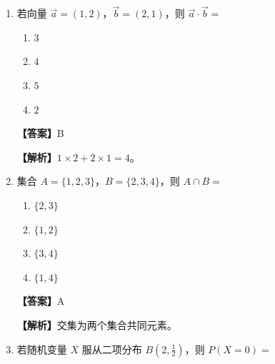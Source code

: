 \documentclass[UTF8,a4paper]{ctexart}
\begin{document}
\begin{enumerate}[leftmargin=2em,itemsep=0.8em]
\begin{enumerate}[label=\Alph*.,itemsep=0.2em,parsep=0pt]
\item $x^{e}$

\end{enumerate}


\par\noindent\textbf{【答案】}B
\par\noindent\textbf{【解析】}指数函数 $e^x$ 的导数仍为 $e^x$。



\item 若向量 $\vec a=(1,2)$，$\vec b=(2,1)$，则 $\vec a \cdot \vec b=$

\begin{enumerate}[label=\Alph*.,itemsep=0.2em,parsep=0pt]

\item $3$

\item $4$

\item $5$

\item $2$

\end{enumerate}


\par\noindent\textbf{【答案】}B
\par\noindent\textbf{【解析】}$1\times2+2\times1=4$。



\item 集合 $A=\{1,2,3\}$，$B=\{2,3,4\}$，则 $A\cap B=$

\begin{enumerate}[label=\Alph*.,itemsep=0.2em,parsep=0pt]

\item $\{2,3\}$

\item $\{1,2\}$

\item $\{3,4\}$

\item $\{1,4\}$

\end{enumerate}


\par\noindent\textbf{【答案】}A
\par\noindent\textbf{【解析】}交集为两个集合共同元素。



\item 若随机变量 $X$ 服从二项分布 $B(2,\frac12)$，则 $P(X=0)=$


\end{enumerate}
\end{document}
